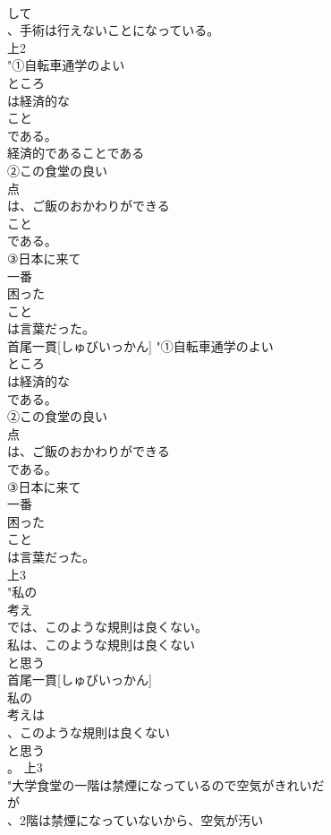 \documentclass[8pt]{extreport}
\begin{document}
\begin{CJK}{UTF8}{min}
\\	して
\\	、手術は行えないことになっている。
\\	上2
\\	"➀自転車通学のよい
\\	ところ
\\	は経済的な
\\	こと
\\	である。
\\	経済的であることである
\\	➁この食堂の良い
\\	点
\\	は、ご飯のおかわりができる
\\	こと
\\	である。
\\	③日本に来て
\\	一番
\\	困った
\\	こと
\\	は言葉だった。
\\	首尾一貫[しゅびいっかん]	"➀自転車通学のよい
\\	ところ
\\	は経済的な
\\	である。
\\	➁この食堂の良い
\\	点
\\	は、ご飯のおかわりができる
\\	である。
\\	③日本に来て
\\	一番
\\	困った
\\	こと
\\	は言葉だった。
\\	上3
\\	"私の
\\	考え
\\	では、このような規則は良くない。
\\	私は、このような規則は良くない
\\	と思う
\\	首尾一貫[しゅびいっかん]	
\\	私の
\\	考えは
\\	、このような規則は良くない
\\	と思う
\\	。			上3
\\	"大学食堂の一階は禁煙になっているので空気がきれいだ
\\	が
\\	、2階は禁煙になっていないから、空気が汚い

\end{CJK}
\end{document}
